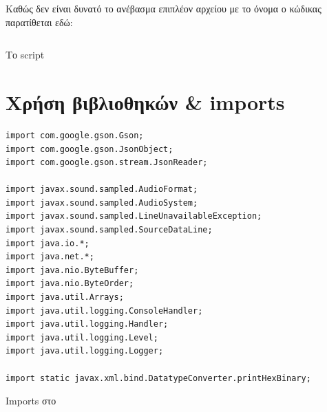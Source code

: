 Καθώς δεν είναι δυνατό το ανέβασμα επιπλέον αρχείου με το όνομα \scriptname{} ο κώδικας παρατίθεται εδώ:
\begin{code}
\inputminted[frame=single, breaklines=true, linenos=true, python3=true]{python}{../extract-codes.py}
\caption{Το script \scriptname{}}
\label{listing:extract-codes}
\end{code}

\section{Χρήση βιβλιοθηκών \& imports}
\begin{code}
\begin{verbatim}
import com.google.gson.Gson;
import com.google.gson.JsonObject;
import com.google.gson.stream.JsonReader;

import javax.sound.sampled.AudioFormat;
import javax.sound.sampled.AudioSystem;
import javax.sound.sampled.LineUnavailableException;
import javax.sound.sampled.SourceDataLine;
import java.io.*;
import java.net.*;
import java.nio.ByteBuffer;
import java.nio.ByteOrder;
import java.util.Arrays;
import java.util.logging.ConsoleHandler;
import java.util.logging.Handler;
import java.util.logging.Level;
import java.util.logging.Logger;

import static javax.xml.bind.DatatypeConverter.printHexBinary;
\end{verbatim}
\caption{Imports στο \appname}
\end{code}

